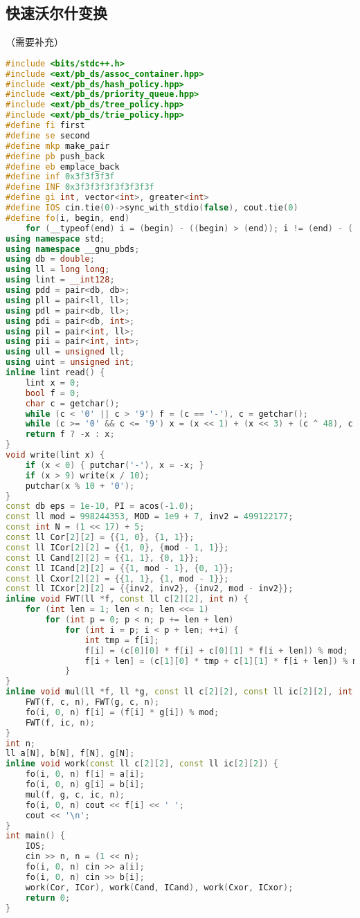 \documentclass[9pt, a4paper, oneside]{book}
\begin{document}
\subsection{快速沃尔什变换}
（需要补充）
\begin{lstlisting}[language={C++}]
#include <bits/stdc++.h>
#include <ext/pb_ds/assoc_container.hpp>
#include <ext/pb_ds/hash_policy.hpp>
#include <ext/pb_ds/priority_queue.hpp>
#include <ext/pb_ds/tree_policy.hpp>
#include <ext/pb_ds/trie_policy.hpp>
#define fi first
#define se second
#define mkp make_pair
#define pb push_back
#define eb emplace_back
#define inf 0x3f3f3f3f
#define INF 0x3f3f3f3f3f3f3f3f
#define gi int, vector<int>, greater<int>
#define IOS cin.tie(0)->sync_with_stdio(false), cout.tie(0)
#define fo(i, begin, end)                                                                                              \
    for (__typeof(end) i = (begin) - ((begin) > (end)); i != (end) - ((begin) > (end)); i += 1 - 2 * ((begin) > (end)))
using namespace std;
using namespace __gnu_pbds;
using db = double;
using ll = long long;
using lint = __int128;
using pdd = pair<db, db>;
using pll = pair<ll, ll>;
using pdl = pair<db, ll>;
using pdi = pair<db, int>;
using pil = pair<int, ll>;
using pii = pair<int, int>;
using ull = unsigned ll;
using uint = unsigned int;
inline lint read() {
    lint x = 0;
    bool f = 0;
    char c = getchar();
    while (c < '0' || c > '9') f = (c == '-'), c = getchar();
    while (c >= '0' && c <= '9') x = (x << 1) + (x << 3) + (c ^ 48), c = getchar();
    return f ? -x : x;
}
void write(lint x) {
    if (x < 0) { putchar('-'), x = -x; }
    if (x > 9) write(x / 10);
    putchar(x % 10 + '0');
}
const db eps = 1e-10, PI = acos(-1.0);
const ll mod = 998244353, MOD = 1e9 + 7, inv2 = 499122177;
const int N = (1 << 17) + 5;
const ll Cor[2][2] = {{1, 0}, {1, 1}};
const ll ICor[2][2] = {{1, 0}, {mod - 1, 1}};
const ll Cand[2][2] = {{1, 1}, {0, 1}};
const ll ICand[2][2] = {{1, mod - 1}, {0, 1}};
const ll Cxor[2][2] = {{1, 1}, {1, mod - 1}};
const ll ICxor[2][2] = {{inv2, inv2}, {inv2, mod - inv2}};
inline void FWT(ll *f, const ll c[2][2], int n) {
    for (int len = 1; len < n; len <<= 1)
        for (int p = 0; p < n; p += len + len)
            for (int i = p; i < p + len; ++i) {
                int tmp = f[i];
                f[i] = (c[0][0] * f[i] + c[0][1] * f[i + len]) % mod;
                f[i + len] = (c[1][0] * tmp + c[1][1] * f[i + len]) % mod;
            }
}
inline void mul(ll *f, ll *g, const ll c[2][2], const ll ic[2][2], int n) {
    FWT(f, c, n), FWT(g, c, n);
    fo(i, 0, n) f[i] = (f[i] * g[i]) % mod;
    FWT(f, ic, n);
}
int n;
ll a[N], b[N], f[N], g[N];
inline void work(const ll c[2][2], const ll ic[2][2]) {
    fo(i, 0, n) f[i] = a[i];
    fo(i, 0, n) g[i] = b[i];
    mul(f, g, c, ic, n);
    fo(i, 0, n) cout << f[i] << ' ';
    cout << '\n';
}
int main() {
    IOS;
    cin >> n, n = (1 << n);
    fo(i, 0, n) cin >> a[i];
    fo(i, 0, n) cin >> b[i];
    work(Cor, ICor), work(Cand, ICand), work(Cxor, ICxor);
    return 0;
}\end{lstlisting}
\end{document}
